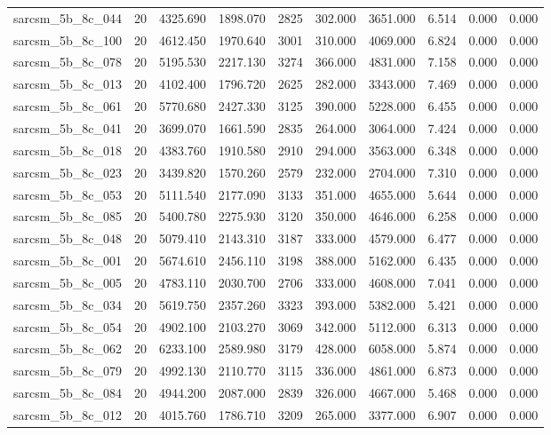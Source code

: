 \begin{tabular}{lrrrrrrrrr}
sarcsm\_5b\_8c\_044 & 20 & 4325.690 & 1898.070 & 2825 & 302.000 & 3651.000 & 6.514 & 0.000 & 0.000 \\
sarcsm\_5b\_8c\_100 & 20 & 4612.450 & 1970.640 & 3001 & 310.000 & 4069.000 & 6.824 & 0.000 & 0.000 \\
sarcsm\_5b\_8c\_078 & 20 & 5195.530 & 2217.130 & 3274 & 366.000 & 4831.000 & 7.158 & 0.000 & 0.000 \\
sarcsm\_5b\_8c\_013 & 20 & 4102.400 & 1796.720 & 2625 & 282.000 & 3343.000 & 7.469 & 0.000 & 0.000 \\
sarcsm\_5b\_8c\_061 & 20 & 5770.680 & 2427.330 & 3125 & 390.000 & 5228.000 & 6.455 & 0.000 & 0.000 \\
sarcsm\_5b\_8c\_041 & 20 & 3699.070 & 1661.590 & 2835 & 264.000 & 3064.000 & 7.424 & 0.000 & 0.000 \\
sarcsm\_5b\_8c\_018 & 20 & 4383.760 & 1910.580 & 2910 & 294.000 & 3563.000 & 6.348 & 0.000 & 0.000 \\
sarcsm\_5b\_8c\_023 & 20 & 3439.820 & 1570.260 & 2579 & 232.000 & 2704.000 & 7.310 & 0.000 & 0.000 \\
sarcsm\_5b\_8c\_053 & 20 & 5111.540 & 2177.090 & 3133 & 351.000 & 4655.000 & 5.644 & 0.000 & 0.000 \\
sarcsm\_5b\_8c\_085 & 20 & 5400.780 & 2275.930 & 3120 & 350.000 & 4646.000 & 6.258 & 0.000 & 0.000 \\
sarcsm\_5b\_8c\_048 & 20 & 5079.410 & 2143.310 & 3187 & 333.000 & 4579.000 & 6.477 & 0.000 & 0.000 \\
sarcsm\_5b\_8c\_001 & 20 & 5674.610 & 2456.110 & 3198 & 388.000 & 5162.000 & 6.435 & 0.000 & 0.000 \\
sarcsm\_5b\_8c\_005 & 20 & 4783.110 & 2030.700 & 2706 & 333.000 & 4608.000 & 7.041 & 0.000 & 0.000 \\
sarcsm\_5b\_8c\_034 & 20 & 5619.750 & 2357.260 & 3323 & 393.000 & 5382.000 & 5.421 & 0.000 & 0.000 \\
sarcsm\_5b\_8c\_054 & 20 & 4902.100 & 2103.270 & 3069 & 342.000 & 5112.000 & 6.313 & 0.000 & 0.000 \\
sarcsm\_5b\_8c\_062 & 20 & 6233.100 & 2589.980 & 3179 & 428.000 & 6058.000 & 5.874 & 0.000 & 0.000 \\
sarcsm\_5b\_8c\_079 & 20 & 4992.130 & 2110.770 & 3115 & 336.000 & 4861.000 & 6.873 & 0.000 & 0.000 \\
sarcsm\_5b\_8c\_084 & 20 & 4944.200 & 2087.000 & 2839 & 326.000 & 4667.000 & 5.468 & 0.000 & 0.000 \\
sarcsm\_5b\_8c\_012 & 20 & 4015.760 & 1786.710 & 3209 & 265.000 & 3377.000 & 6.907 & 0.000 & 0.000 \\

\end{tabular}
